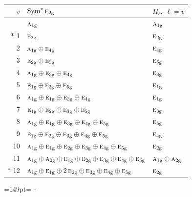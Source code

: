 \documentclass[10pt,a4paper]{article}
\newcommand{\needspace}[1]{\par\penalty-100\begingroup\dimen0=#1\relax\dimen2=\pagegoal
  \advance\dimen2-\pagetotal\ifdim\dimen0>\dimen2\relax\ifdim\dimen2>0pt\vfil\break\fi\fi
  \endgroup}
\numberwithin{equation}{section}
\newcommand{\irr}[1]{\text{\normalfont\scshape #1}}
\newcommand{\ptag}[1]{\mathrm{#1}}
\begin{document}
{\small\begin{longtable}{@{}rll@{}}\toprule
$v$ & $\operatorname{Sym}^{v}\irr{e}_{2\ptag{g}}$ & $H_\ell$, $\ell = v$\\\midrule\endhead
\bottomrule\endfoot\endlastfoot
0 & $\irr{a}_{1\ptag{g}}$ & $\irr{a}_{1\ptag{g}}$\\*
1 & $\irr{e}_{2\ptag{g}}$ & $\irr{e}_{2\ptag{g}}$\\
2 & $\irr{a}_{1\ptag{g}} \oplus \irr{e}_{4\ptag{g}}$ & $\irr{e}_{4\ptag{g}}$\\
3 & $\irr{e}_{2\ptag{g}} \oplus \irr{e}_{5\ptag{g}}$ & $\irr{e}_{5\ptag{g}}$\\
4 & $\irr{a}_{1\ptag{g}} \oplus \irr{e}_{3\ptag{g}} \oplus \irr{e}_{4\ptag{g}}$ & $\irr{e}_{3\ptag{g}}$\\
5 & $\irr{e}_{1\ptag{g}} \oplus \irr{e}_{2\ptag{g}} \oplus \irr{e}_{5\ptag{g}}$ & $\irr{e}_{1\ptag{g}}$\\
6 & $\irr{a}_{1\ptag{g}} \oplus \irr{e}_{1\ptag{g}} \oplus \irr{e}_{3\ptag{g}} \oplus \irr{e}_{4\ptag{g}}$ & $\irr{e}_{1\ptag{g}}$\\
7 & $\irr{e}_{1\ptag{g}} \oplus \irr{e}_{2\ptag{g}} \oplus \irr{e}_{3\ptag{g}} \oplus \irr{e}_{5\ptag{g}}$ & $\irr{e}_{3\ptag{g}}$\\
8 & $\irr{a}_{1\ptag{g}} \oplus \irr{e}_{1\ptag{g}} \oplus \irr{e}_{3\ptag{g}} \oplus \irr{e}_{4\ptag{g}} \oplus \irr{e}_{5\ptag{g}}$ & $\irr{e}_{5\ptag{g}}$\\
9 & $\irr{e}_{1\ptag{g}} \oplus \irr{e}_{2\ptag{g}} \oplus \irr{e}_{3\ptag{g}} \oplus \irr{e}_{4\ptag{g}} \oplus \irr{e}_{5\ptag{g}}$ & $\irr{e}_{4\ptag{g}}$\\
10 & $\irr{a}_{1\ptag{g}} \oplus \irr{e}_{1\ptag{g}} \oplus \irr{e}_{2\ptag{g}} \oplus \irr{e}_{3\ptag{g}} \oplus \irr{e}_{4\ptag{g}} \oplus \irr{e}_{5\ptag{g}}$ & $\irr{e}_{2\ptag{g}}$\\
11 & $\irr{a}_{1\ptag{g}} \oplus \irr{a}_{2\ptag{g}} \oplus \irr{e}_{1\ptag{g}} \oplus \irr{e}_{2\ptag{g}} \oplus \irr{e}_{3\ptag{g}} \oplus \irr{e}_{4\ptag{g}} \oplus \irr{e}_{5\ptag{g}}$ & $\irr{a}_{1\ptag{g}} \oplus \irr{a}_{2\ptag{g}}$\\*
12 & $\irr{a}_{1\ptag{g}} \oplus \irr{e}_{1\ptag{g}} \oplus 2\,\irr{e}_{2\ptag{g}} \oplus \irr{e}_{3\ptag{g}} \oplus \irr{e}_{4\ptag{g}} \oplus \irr{e}_{5\ptag{g}}$ & $\irr{e}_{2\ptag{g}}$\\
\bottomrule\end{longtable}}
\needspace{149pt}
\end{document}
